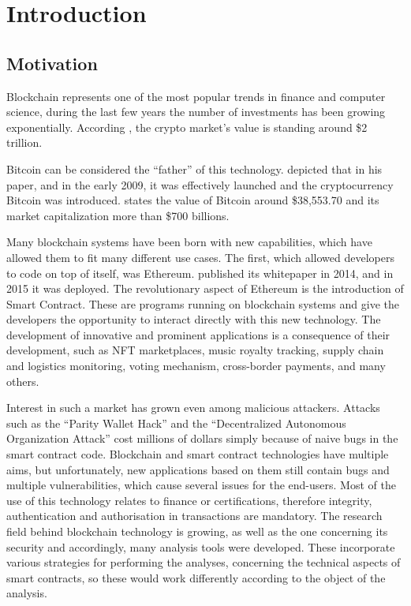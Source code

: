 \chapter{Introduction}
\label{ch:Introduction}


\section{Motivation}
\label{sec:Introduction:Motivation}

Blockchain represents one of the most popular trends in finance and computer science, 
during the last few years the number of investments has been growing exponentially. 
According \citet{CoinGeko}, the crypto market's value is standing around \$2 trillion.

Bitcoin can be considered the “father” of this technology. \citet{Bitcoin} depicted that in his paper, and in the early 2009,
it was effectively launched and the cryptocurrency Bitcoin was introduced. 
\citet{CoinGeko} states the value of Bitcoin around \$38,553.70 and its market capitalization more than  \$700 billions.

Many blockchain systems have been born with new capabilities, 
which have allowed them to fit many different use cases. The first, which allowed developers to 
code on top of itself, was Ethereum.
\citet{Ethereum} published its whitepaper in 2014, and in 2015 it was deployed.
The revolutionary aspect of Ethereum is the introduction of Smart Contract.
These are programs running on blockchain systems and give the developers the opportunity to interact directly 
with this new technology. 
The development of innovative and prominent applications is a consequence of their development, such as NFT marketplaces, music royalty tracking, supply chain and logistics monitoring, voting mechanism, 
cross-border payments, and many others.  

Interest in such a market has grown even among malicious attackers. 
Attacks such as the “Parity Wallet Hack” and the “Decentralized Autonomous Organization Attack” cost millions of dollars simply because of 
naive bugs in the smart contract code. Blockchain and smart contract technologies have multiple aims, but unfortunately, new applications 
based on them still contain bugs and multiple vulnerabilities, which cause 
several issues for the end-users. Most of the use of this technology relates to finance or certifications, therefore integrity, 
authentication and authorisation in transactions are mandatory. The research field behind blockchain technology is growing, as well as the one concerning 
its security and accordingly, many analysis tools were developed. 
These incorporate various strategies for performing the analyses, concerning the technical aspects of smart contracts, 
so these would work differently according to the object of the analysis. 


